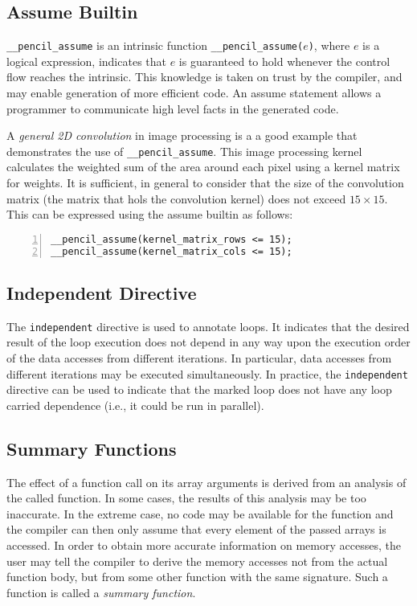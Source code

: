 \documentclass{llncs}
\begin{document}
\subsection{Assume Builtin}

\lstinline!__pencil_assume! is an intrinsic function 
\lstinline!__pencil_assume(!$e$\lstinline!)!, where $e$ is a logical expression,
indicates that $e$ is guaranteed to hold whenever the control flow reaches
the intrinsic.
This knowledge is taken on trust by the \pencil compiler, and may enable
generation of more efficient code.
An assume statement allows a programmer to communicate high level facts
in the generated code.

A \emph{general 2D convolution} in image processing is a a good
example that demonstrates the use of \lstinline!__pencil_assume!.
This image processing kernel calculates the weighted sum of the
area around each pixel using a kernel matrix for weights.
It is sufficient, in general to consider that the size of the
convolution matrix (the matrix that hols the convolution kernel)
does not exceed $15\times15$.
This can be expressed using the assume builtin as follows:

\begin{lstlisting}[stepnumber=1,numbers=left,numberstyle={\tiny\tt},numbersep=5pt,escapechar=@,language=pencil]
__pencil_assume(kernel_matrix_rows <= 15);
__pencil_assume(kernel_matrix_cols <= 15);
\end{lstlisting}

\subsection{Independent Directive}
\label{sec:for-directives}

The \lstinline!independent! directive is used to annotate loops.
It indicates that the desired result of the loop execution does not
depend in any way upon the execution order of the data accesses from
different iterations.  In particular, data accesses from different
iterations may be executed simultaneously.
In practice, the \lstinline!independent! directive can be used to
indicate that the marked loop does not have any loop carried
dependence (i.e., it could be run in parallel).

\subsection{Summary Functions}
\label{sec:summaries}

The effect of a function call on its array arguments is derived
from an analysis of the called function.
In some cases, the results of this analysis may be too inaccurate.
In the extreme case, no code may be available for the function and the
compiler can then only assume that every element of the passed arrays
is accessed.
In order to obtain more accurate information on memory accesses, the user
may tell the compiler to derive the memory accesses not from the actual
function body, but from some other function with the same signature.
Such a function is called a \emph{summary function}.
\end{document}
